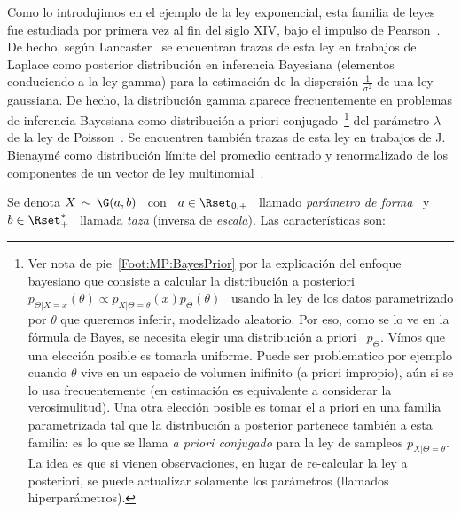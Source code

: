 \label{Sssec:MP:Gamma}

Como lo introdujimos en el ejemplo  de la ley exponencial, esta familia de leyes
fue  estudiada  por primera  vez  al  fin del  siglo  XIV,  bajo  el impulso  de
Pearson~\cite{Pea95}.   De hecho,  seg\'un Lancaster~\cite{Lan66}  se encuentran
trazas  de esta  ley en  trabajos de  Laplace como  posterior  distribuci\'on en
inferencia Bayesiana (elementos conduciendo a la ley gamma) para la estimaci\'on
de  la dispersi\'on  $\frac1{\sigma^2}$  de  una ley  gaussiana.   De hecho,  la
distribuci\'on gamma aparece frecuentemente en problemas de inferencia Bayesiana
como    distribuci\'on     a    priori    conjugado~\footnote{Ver     nota    de
  pie~\ref{Foot:MP:BayesPrior}  por la explicaci\'on  del enfoque  bayesiano que
  consiste  a calcular  la distribuci\'on  a  posteriori $p_{\Theta|X=x}(\theta)
  \propto p_{X|\Theta=\theta}(x) p_\Theta(\theta)$ \  usando la ley de los datos
  parametrizado  por $\theta$  que queremos  inferir, modelizado  aleatorio. Por
  eso,  como  se  lo ve  en  la  f\'ormula  de  Bayes,  se necesita  elegir  una
  distribuci\'on a priori  \ $p_\Theta$.  V\'imos que una  elecci\'on posible es
  tomarla uniforme. Puede  ser problematico por ejemplo cuando  $\theta$ vive en
  un  espacio de  volumen inifinito  (a  priori impropio),  a\'un si  se lo  usa
  frecuentemente (en estimaci\'on es equivalente a considerar la verosimulitud).
  Una otra elecci\'on posible es tomar  el a priori en una familia parametrizada
  tal que la  distribuci\'on a posterior partenece tambi\'en  a esta familia: es
  lo que se llama {\em a  priori conjugado} para la ley de sampleos $p_{X|\Theta
    = \theta}$. La idea es que  si vienen observaciones, en lugar de re-calcular
  la ley a posteriori, se  puede actualizar solamente los par\'ametros (llamados
  hiperpar\'ametros).\label{Foot:MP:BayesPriorConjugado}}     del    par\'ametro
$\lambda$ de la  ley de Poisson~\cite{Rob07}. Se encuentren  tambi\'en trazas de
esta ley en trabajos de J.  Bienaym\'e como distribuci\'on l\'imite del promedio
centrado   y  renormalizado   de   los   componentes  de   un   vector  de   ley
multinomial~\cite{Bie38, Lan66}.

Se  denota $X \,  \sim \,  \G(a,b)$ \  con \  $a \in  \Rset_{0,+}$ \  llamado {\em
par\'ametro de  forma} \ y \  $b \in \Rset_+^*$  \ llamada {\em taza}  (inversa de
{\em escala}). Las caracter\'isticas son:

